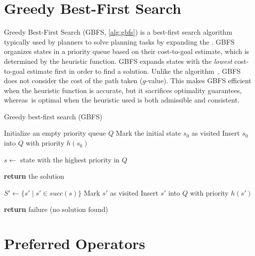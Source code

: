 \documentclass[ppgc,diss,english]{iiufrgs}
\begin{document}
\section{Greedy Best-First Search}
\label{sec:background-gbfs}
Greedy Best-First Search (GBFS, \cref{alg:gbfs}) is a best-first search algorithm typically used by planners to solve planning tasks by expanding the \fsp. GBFS organizes states in a priority queue based on their cost-to-goal estimate, which is determined by the heuristic function. GBFS expands states with the \emph{lowest} cost-to-goal estimate first in order to find a solution. Unlike the \astar algorithm~\cite{Hart.etal/1968}, GBFS does not consider the cost of the path taken ($g$-value). This makes GBFS efficient when the heuristic function is accurate, but it sacrifices optimality guarantees, whereas~\astar is optimal when the heuristic used is both admissible and consistent.

\begin{algorithm}[tb]
\caption{Greedy best-first search (GBFS)}
\label{alg:gbfs}
\begin{algorithmic}[1]
  \State Initialize an empty priority queue $Q$
  \State Mark the initial state $s_0$ as visited
  \State Insert $s_0$ into $Q$ with priority $h(s_0)$

    \State $s \gets$ state with the highest priority in $Q$

      \State \textbf{return} the solution
    \EndIf

    \State $S' \gets \{s' \mid s' \in succ(s)\}$
        \State Mark $s'$ as visited
        \State Insert $s'$ into $Q$ with priority $h(s')$
      \EndIf
    \EndFor
  \EndWhile

  \State \textbf{return} failure (no solution found)
\EndProcedure
\end{algorithmic}
\end{algorithm}

\section{Preferred Operators}
\label{sec:background-preferred-operators}
\end{document}
